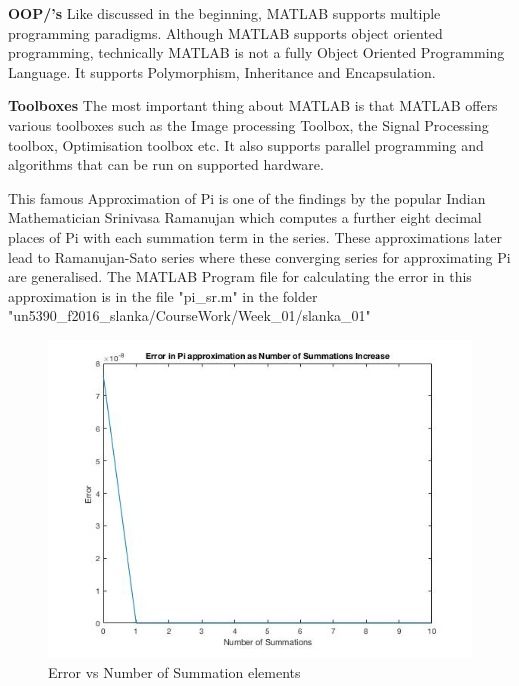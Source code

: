 \documentclass[fleqn,letterpaper,12pt]{report}
\begin{document}
\textbf{OOP/’s}\newline
Like discussed in the beginning, MATLAB supports multiple programming paradigms. Although MATLAB supports object oriented programming, technically MATLAB is not a fully Object Oriented Programming Language.
It supports Polymorphism, Inheritance and Encapsulation.

\textbf{Toolboxes}\newline
The most important thing about MATLAB is that MATLAB offers various toolboxes such as the Image processing Toolbox, the Signal Processing toolbox, Optimisation toolbox etc. It also supports parallel programming and algorithms that can be run on supported hardware.

\vfill

%
\newpage
{}
{}
\problem
This famous Approximation of Pi is one of the findings by the popular Indian Mathematician Srinivasa Ramanujan which computes a further eight decimal places of Pi with each summation term in the series. These approximations later lead to Ramanujan-Sato series where these converging series for approximating Pi are generalised.\newline
The MATLAB Program file for calculating the error in this approximation is in the file "pi\_sr.m" in the folder "un5390\_f2016\_slanka/CourseWork/Week\_01/slanka\_01"\cite{Pi} 
\begin{figure}[ht!]
\centering
\includegraphics[width=140mm]{Pi_sr.jpg}
\caption{Error vs Number of Summation elements\label{overflow}}
\end{figure}
\end{document}
